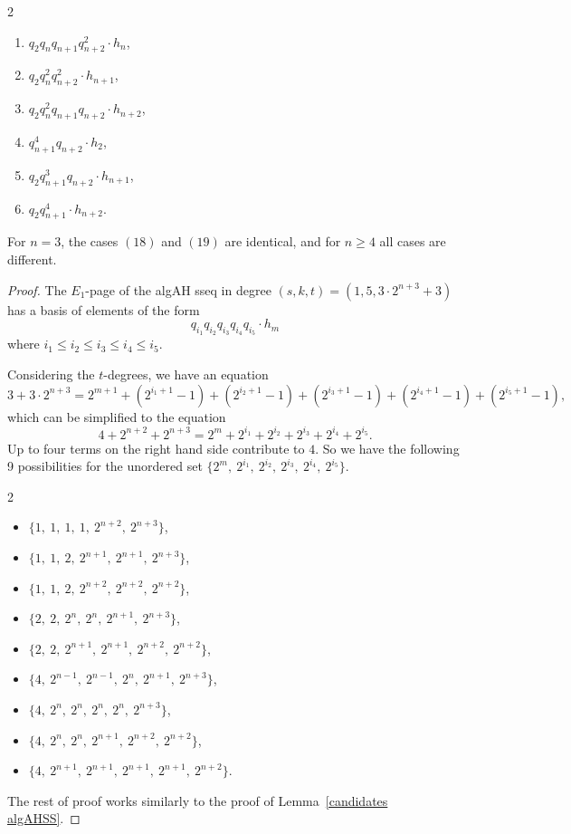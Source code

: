 \begin{lem}
\begin{multicols}{2}
\begin{enumerate}
\item $q_2q_nq_{n+1}q_{n+2}^2 \cdot h_{n}$,
\item $q_2q_{n}^2q_{n+2}^2 \cdot h_{n+1}$,
\item $q_2q_{n}^2q_{n+1}q_{n+2} \cdot h_{n+2}$,
\item $q_{n+1}^4q_{n+2} \cdot h_{2}$,
\item $q_2q_{n+1}^3q_{n+2} \cdot h_{n+1}$,
\item $q_2q_{n+1}^4 \cdot h_{n+2}$.
\end{enumerate}
\end{multicols}
For $n=3$, the cases $(18)$ and $(19)$ are identical, and for $n \geq 4$ all cases are different. 
\end{lem}

\begin{proof}
  The $E_1$-page of the algAH sseq in degree $(s,k,t) = (1,5,3 \cdot 2^{n+3}+3)$
  has a basis of elements of the form
  $$ q_{i_1}q_{i_2}q_{i_3}q_{i_4}q_{i_5} \cdot h_m $$
  where $i_1\leq i_2\leq i_3\leq i_4\leq i_5$.

  Considering the $t$-degrees, we have an equation
  $$3 + 3 \cdot 2^{n+3} = 2^{m+1} + (2^{i_1+1} - 1) + (2^{i_2+1} - 1) + (2^{i_3+1} - 1) + (2^{i_4+1} - 1) + (2^{i_5+1} - 1),$$
  which can be simplified to the equation
  $$ 4 + 2^{n+2} + 2^{n+3} = 2^m + 2^{i_1} + 2^{i_2} + 2^{i_3} + 2^{i_4} + 2^{i_5}. $$
  Up to four terms on the right hand side contribute to $4$. So we have the following 9 possibilities for the unordered set $\{2^m, \ 2^{i_1}, \ 2^{i_2}, \ 2^{i_3}, \ 2^{i_4}, \ 2^{i_5}\}$.
  \begin{multicols}{2}
    \begin{itemize}
    \item $\{1, \ 1, \ 1, \ 1, \ 2^{n+2}, \ 2^{n+3}\}$,
    \item $\{1, \ 1, \ 2, \ 2^{n+1}, \ 2^{n+1}, \ 2^{n+3}\}$,
    \item $\{1, \ 1, \ 2, \ 2^{n+2}, \ 2^{n+2}, \ 2^{n+2}\}$,
    \item $\{2, \ 2, \ 2^n, \ 2^{n}, \ 2^{n+1}, \ 2^{n+3}\}$,
    \item $\{2, \ 2, \ 2^{n+1}, \ 2^{n+1}, \ 2^{n+2}, \ 2^{n+2}\}$,
    \item $\{4, \ 2^{n-1}, \ 2^{n-1}, \ 2^{n}, \ 2^{n+1}, \ 2^{n+3}\}$,
    \item $\{4, \ 2^{n}, \ 2^{n}, \ 2^{n}, \ 2^{n}, \ 2^{n+3}\}$,
    \item $\{4, \ 2^{n}, \ 2^{n}, \ 2^{n+1}, \ 2^{n+2}, \ 2^{n+2}\}$,
    \item $\{4, \ 2^{n+1}, \ 2^{n+1}, \ 2^{n+1}, \ 2^{n+1}, \ 2^{n+2}\}$.
    \end{itemize}
  \end{multicols}
  The rest of proof works similarly to the proof of Lemma~\ref{candidates algAHSS}.
\end{proof}

